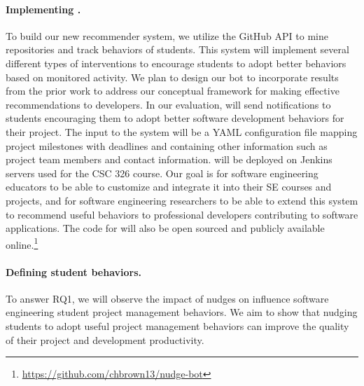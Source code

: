 \paragraph{Implementing \TOOL.} To build our new \TOOL recommender system, we utilize the GitHub API to mine repositories and track behaviors of students. This system will implement several different types of interventions to encourage students to adopt better behaviors based on monitored activity. We plan to design our bot to incorporate results from the prior work to address our conceptual framework for making effective recommendations to developers. In our evaluation, \TOOL will send notifications to students encouraging them to adopt better software development behaviors for their project. The input to the system will be a YAML configuration file mapping project milestones with deadlines and containing other information such as project team members and contact information. \TOOL will be deployed on Jenkins servers used for the CSC 326 course. Our goal is for software engineering educators to be able to customize \TOOL and integrate it into their SE courses and projects, and for software engineering researchers to be able to extend this system to recommend useful behaviors to professional developers contributing to software applications. The code for \TOOL will also be open sourced and publicly available online.\footnote{\url{https://github.com/chbrown13/nudge-bot}}

\paragraph{Defining student behaviors.} To answer RQ1, we will observe the impact of nudges on influence software engineering student project management behaviors. We aim to show that nudging students to adopt useful project management behaviors can improve the quality of their project and development productivity.

